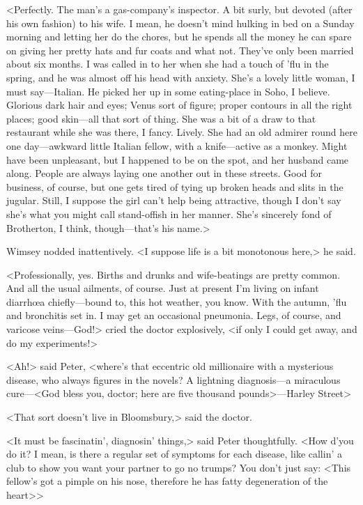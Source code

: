 <Perfectly. The man's a gas-company's inspector. A bit surly, but devoted (after his own fashion) to his wife. I mean, he doesn't mind hulking in bed on a Sunday morning and letting her do the chores, but he spends all the money he can spare on giving her pretty hats and fur coats and what not. They've only been married about six months. I was called in to her when she had a touch of 'flu in the spring, and he was almost off his head with anxiety. She's a lovely little woman, I must say—Italian. He picked her up in some eating-place in Soho, I believe. Glorious dark hair and eyes; Venus sort of figure; proper contours in all the right places; good skin—all that sort of thing. She was a bit of a draw to that restaurant while she was there, I fancy. Lively. She had an old admirer round here one day—awkward little Italian fellow, with a knife—active as a monkey. Might have been unpleasant, but I happened to be on the spot, and her husband came along. People are always laying one another out in these streets. Good for business, of course, but one gets tired of tying up broken heads and slits in the jugular. Still, I suppose the girl can't help being attractive, though I don't say she's what you might call stand-offish in her manner. She's sincerely fond of Brotherton, I think, though—that's his name.>

Wimsey nodded inattentively. <I suppose life is a bit monotonous here,> he said.

<Professionally, yes. Births and drunks and wife-beatings are pretty common. And all the usual ailments, of course. Just at present I'm living on infant diarrhœa chiefly—bound to, this hot weather, you know. With the autumn, 'flu and bronchitis set in. I may get an occasional pneumonia. Legs, of course, and varicose veins—God!> cried the doctor explosively, <if only I could get away, and do my experiments!>

<Ah!> said Peter, <where's that eccentric old millionaire with a mysterious disease, who always figures in the novels? A lightning diagnosis—a miraculous cure—<God bless you, doctor; here are five thousand pounds>—Harley Street\longdash>

<That sort doesn't live in Bloomsbury,> said the doctor.

<It must be fascinatin', diagnosin' things,> said Peter thoughtfully. <How d'you do it? I mean, is there a regular set of symptoms for each disease, like callin' a club to show you want your partner to go no trumps? You don't just say: <This fellow's got a pimple on his nose, therefore he has fatty degeneration of the heart\longdash>>

